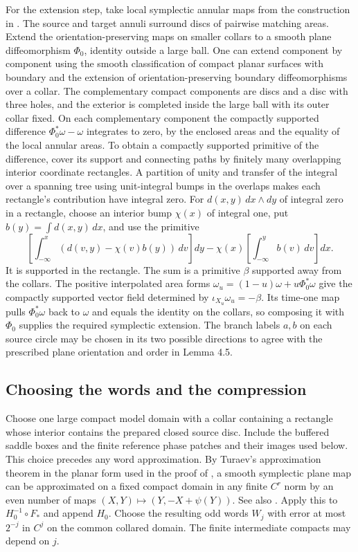 \documentclass[11pt]{article}
\begin{document}
For the extension step, take local symplectic annular maps from the construction
in \cite[Lemma 4.5]{BT}. The source and target annuli surround discs of pairwise
matching areas. Extend the orientation-preserving maps on smaller collars to a
smooth plane diffeomorphism \(\Phi_0\), identity outside a large ball. One can
extend component by component using the smooth classification of compact planar
surfaces with boundary and the extension of orientation-preserving boundary
diffeomorphisms over a collar. The complementary compact components are discs
and a disc with three holes, and the exterior is completed inside the large ball
with its outer collar fixed. On each complementary component the compactly
supported difference \(\Phi_0^*\omega-\omega\) integrates to zero, by the
enclosed areas and the equality of the local annular areas. To obtain a
compactly supported primitive of the difference, cover its support and
connecting paths by finitely many overlapping interior coordinate rectangles. A
partition of unity and transfer of the integral over a spanning tree using
unit-integral bumps in the overlaps makes each rectangle's contribution have
integral zero. For \(d(x,y)\,dx\wedge dy\) of integral zero in a rectangle,
choose an interior bump \(\chi(x)\) of integral one, put
\(b(y)=\int d(x,y)\,dx\), and use the primitive \[
 \left[\int_{-\infty}^x (d(v,y)-\chi(v)b(y))\,dv\right]dy
 -\chi(x)\left[\int_{-\infty}^y b(v)\,dv\right]dx .
\] It is supported in the rectangle. The sum is a primitive \(\beta\) supported
away from the collars. The positive interpolated area forms
\(\omega_u=(1-u)\omega+u\Phi_0^*\omega\) give the compactly supported vector
field determined by \(\iota_{X_u}\omega_u=-\beta\). Its time-one map pulls
\(\Phi_0^*\omega\) back to \(\omega\) and equals the identity on the collars, so
composing it with \(\Phi_0\) supplies the required symplectic extension. The
branch labels \(a,b\) on each source circle may be chosen in its two possible
directions to agree with the prescribed plane orientation and order in Lemma
4.5.



\subsection{Choosing the words and the
compression}\label{choosing-the-words-and-the-compression}

Choose one large compact model domain with a collar containing a rectangle whose
interior contains the prepared closed source disc. Include the buffered saddle
boxes and the finite reference phase patches and their images used below. This
choice precedes any word approximation. By Turaev's approximation theorem in the
planar form used in the proof of \cite[Corollary 6.3]{BT}, a smooth symplectic
plane map can be approximated on a fixed compact domain in any finite \(C^r\)
norm by an even number of maps \((X,Y)\mapsto(Y,-X+\psi(Y))\). See also
\cite[Theorem 2]{Turaev}. Apply this to \(H_0^{-1}\circ F_*\) and append
\(H_0\). Choose the resulting odd words \(W_j\) with error at most \(2^{-j}\) in
\(C^j\) on the common collared domain. The finite intermediate compacts may
depend on \(j\).
\end{document}
